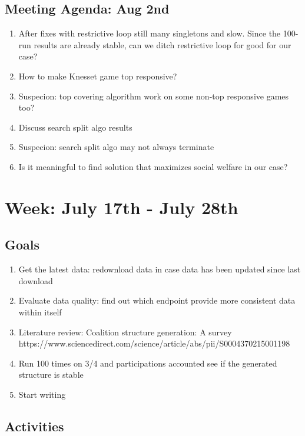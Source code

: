 \documentclass[a4paper]{article}
\begin{document}
\subsection*{Meeting Agenda: Aug 2nd}

\begin{enumerate}
  \item After fixes with restrictive loop still many singletons and slow. Since the 100-run results are already stable, can we ditch restrictive loop for good for our case?
  \item How to make Knesset game top responsive?
  \item Suspecion: top covering algorithm work on some non-top responsive games too?
  \item Discuss search split algo results
  \item Suspecion: search split algo may not always terminate
  \item Is it meaningful to find solution that maximizes social welfare in our case?
\end{enumerate}

\section*{Week: July 17th - July 28th}

\subsection*{Goals}

\begin{enumerate}
  \item Get the latest data: redownload data in case data has been updated since last download
  \item Evaluate data quality: find out which endpoint provide more consistent data within itself
  \item Literature review: Coalition structure generation: A survey https://www.sciencedirect.com/science/article/abs/pii/S0004370215001198
  \item Run 100 times on 3/4 and participations accounted see if the generated structure is stable
  \item Start writing
\end{enumerate}

\subsection*{Activities}
\end{document}
